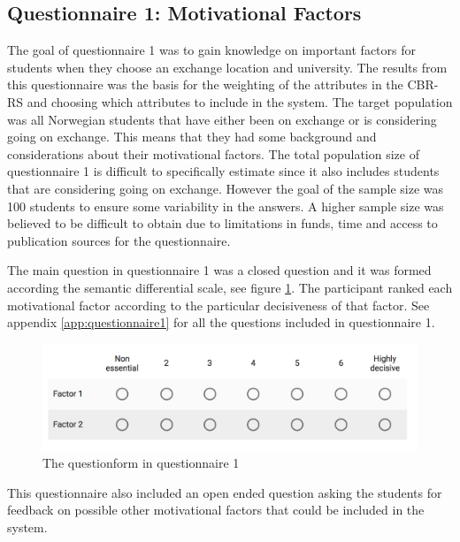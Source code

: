 \subsection{Questionnaire 1: Motivational Factors}\label{sec:questionnaire_1}

The goal of questionnaire 1 was to gain knowledge on important factors for students when they choose an exchange location and university. The results from this questionnaire was the basis for the weighting of the attributes in the CBR-RS and choosing which attributes to include in the system. The target population was all Norwegian students that have either been on exchange or is considering going on exchange. This means that they had some background and considerations about their motivational factors. The total population size of questionnaire 1 is difficult to specifically estimate since it also includes students that are considering going on exchange. However the goal of the sample size was 100 students to ensure some variability in the answers. A higher sample size was believed to be difficult to obtain due to limitations in funds, time and access to publication sources for the questionnaire. 


The main question in questionnaire 1 was a closed question and it was formed according the semantic differential scale, see figure \ref{fig:semantic_scale}. The participant ranked each motivational factor according to the particular decisiveness of that factor. See appendix \ref{app:questionnaire1} for all the questions included in questionnaire 1. 

\begin{figure}[h!]
    \centering
    \includegraphics[width=1\textwidth]{fig/question1.png}
    \caption{The questionform in questionnaire 1}
    \label{fig:semantic_scale}
\end{figure}

This questionnaire also included an open ended question asking the students for feedback on possible other motivational factors that could be included in the system.

